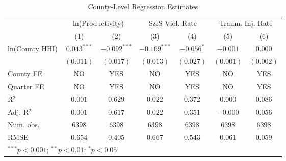 
\begin{table}
\begin{center}
\begin{tabular}{l c c c c c c}
\hline
 & \multicolumn{2}{c}{ln(Productivity)} & \multicolumn{2}{c}{S\&S Viol. Rate} & \multicolumn{2}{c}{Traum. Inj. Rate} \\
\cline{2-3} \cline{4-5} \cline{6-7}
 & (1) & (2) & (3) & (4) & (5) & (6) \\
\hline
ln(County HHI) & $0.043^{***}$ & $-0.092^{***}$ & $-0.169^{***}$ & $-0.056^{*}$ & $-0.001$  & $0.000$   \\
               & $(0.011)$     & $(0.017)$      & $(0.013)$      & $(0.027)$    & $(0.001)$ & $(0.002)$ \\
\hline
County FE      & NO            & YES            & NO             & YES          & NO        & YES       \\
Quarter FE     & NO            & YES            & NO             & YES          & NO        & YES       \\
R$^2$          & $0.001$       & $0.629$        & $0.022$        & $0.372$      & $0.000$   & $0.086$   \\
Adj. R$^2$     & $0.001$       & $0.617$        & $0.022$        & $0.351$      & $-0.000$  & $0.056$   \\
Num. obs.      & $6398$        & $6398$         & $6398$         & $6398$       & $6398$    & $6398$    \\
RMSE           & $0.654$       & $0.405$        & $0.667$        & $0.543$      & $0.061$   & $0.059$   \\
\hline
\multicolumn{7}{l}{\scriptsize{$^{***}p<0.001$; $^{**}p<0.01$; $^{*}p<0.05$}}
\end{tabular}
\caption{County-Level Regression Estimates}
\label{ols_hhi_county}
\end{center}
\end{table}

